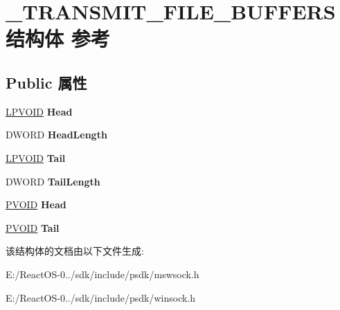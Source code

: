 \hypertarget{struct___t_r_a_n_s_m_i_t___f_i_l_e___b_u_f_f_e_r_s}{}\section{\+\_\+\+T\+R\+A\+N\+S\+M\+I\+T\+\_\+\+F\+I\+L\+E\+\_\+\+B\+U\+F\+F\+E\+R\+S结构体 参考}
\label{struct___t_r_a_n_s_m_i_t___f_i_l_e___b_u_f_f_e_r_s}
\subsection*{Public 属性}
\begin{DoxyCompactItemize}
\item 
\mbox{\label{struct___t_r_a_n_s_m_i_t___f_i_l_e___b_u_f_f_e_r_s_a887f7e750e430eafdd88776205467bf7}} 
\hyperlink{interfacevoid}{L\+P\+V\+O\+ID} {\bfseries Head}
\item 
\mbox{\label{struct___t_r_a_n_s_m_i_t___f_i_l_e___b_u_f_f_e_r_s_a5b6983860fbebdc18533fc969406fe64}} 
D\+W\+O\+RD {\bfseries Head\+Length}
\item 
\mbox{\label{struct___t_r_a_n_s_m_i_t___f_i_l_e___b_u_f_f_e_r_s_a8586ac39cfefe433c3c3b96909cde7b8}} 
\hyperlink{interfacevoid}{L\+P\+V\+O\+ID} {\bfseries Tail}
\item 
\mbox{\label{struct___t_r_a_n_s_m_i_t___f_i_l_e___b_u_f_f_e_r_s_af0e011c0beb96793dce012f2e73467ea}} 
D\+W\+O\+RD {\bfseries Tail\+Length}
\item 
\mbox{\label{struct___t_r_a_n_s_m_i_t___f_i_l_e___b_u_f_f_e_r_s_a42e90cfd62abe47ca88954db544d188b}} 
\hyperlink{interfacevoid}{P\+V\+O\+ID} {\bfseries Head}
\item 
\mbox{\label{struct___t_r_a_n_s_m_i_t___f_i_l_e___b_u_f_f_e_r_s_a06c2d164d182822e68e5f65722b2065f}} 
\hyperlink{interfacevoid}{P\+V\+O\+ID} {\bfseries Tail}
\end{DoxyCompactItemize}


该结构体的文档由以下文件生成\+:\begin{DoxyCompactItemize}
\item 
E\+:/\+React\+O\+S-\/0../sdk/include/psdk/mswsock.\+h\item 
E\+:/\+React\+O\+S-\/0../sdk/include/psdk/winsock.\+h\end{DoxyCompactItemize}
